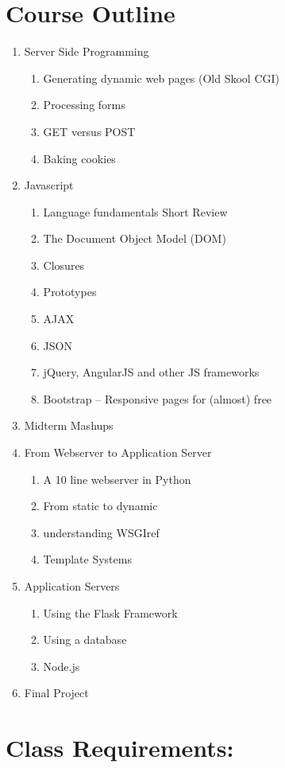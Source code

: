 \documentclass[11pt,twocolumn]{article}
\begin{document}
\section*{Course Outline}
\begin{enumerate}
	\addtolength{\itemsep}{-0.5\baselineskip}
    \item Server Side Programming
	\begin{enumerate}
		\item Generating dynamic web pages  (Old Skool CGI)
		\item Processing forms
		\item GET versus POST
		\item Baking cookies
	\end{enumerate}
	\item Javascript
	\begin{enumerate}
 		\item Language fundamentals Short Review
		\item The Document Object Model (DOM)
		\item Closures
		\item Prototypes
		\item AJAX
		\item JSON
		\item jQuery, AngularJS and other JS frameworks
        \item Bootstrap -- Responsive pages for (almost) free
	\end{enumerate}
	\item Midterm Mashups
	\item From Webserver to Application Server
	\begin{enumerate}
		\item A 10 line webserver in Python
		\item From static to dynamic
		\item understanding WSGIref
		\item Template Systems
	\end{enumerate}
	\item Application Servers
	\begin{enumerate}
		\item Using the Flask Framework
		\item Using a database
		\item Node.js
	\end{enumerate}
	\item Final Project
\end{enumerate}

\section*{Class Requirements:}
\end{document}
